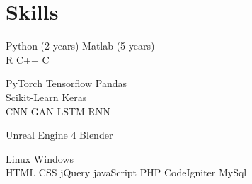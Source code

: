 \begin{minipage}[t]{0.33\textwidth}
\sectionspace %

\section{Skills}

\textbullet{} Python (2 years) \textbullet{}  Matlab (5 years) \\ 
\textbullet{} R \textbullet{} C++ \textbullet{} C \\
\sectionspace %

\textbullet{} PyTorch \textbullet{} Tensorflow \textbullet{} Pandas \\
\textbullet{} Scikit-Learn \textbullet{} Keras\\ 
\textbullet{} CNN \textbullet{} GAN \textbullet{} LSTM \textbullet{} RNN\\
\sectionspace %

\textbullet{} Unreal Engine 4 \textbullet{} Blender
\sectionspace %

\textbullet{} Linux \textbullet{} Windows\\ 
\textbullet{} HTML\textbullet{} CSS\textbullet{} jQuery\textbullet{} javaScript\textbullet{} PHP\textbullet{} CodeIgniter\textbullet{} MySql
\\

\end{minipage} %
\hfill
%
%
